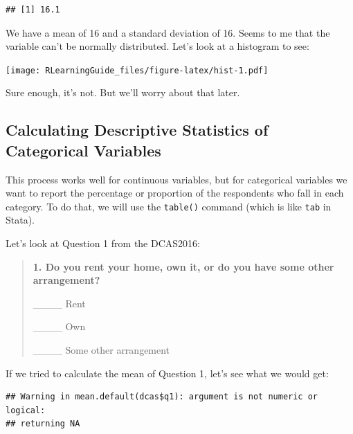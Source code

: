 \documentclass[]{article}
\newenvironment{Shaded}{\begin{snugshade}}{\end{snugshade}}
\newcommand{\KeywordTok}[1]{\textcolor[rgb]{0.13,0.29,0.53}{\textbf{{#1}}}}
\newcommand{\NormalTok}[1]{{#1}}
\begin{document}
\begin{verbatim}
## [1] 16.1
\end{verbatim}

We have a mean of 16 and a standard deviation of 16. Seems to me that
the variable can't be normally distributed. Let's look at a histogram to
see:

\begin{Shaded}
\end{Shaded}

\texttt{[image: RLearningGuide\_files/figure-latex/hist-1.pdf]}

Sure enough, it's not. But we'll worry about that later.

\subsection{Calculating Descriptive Statistics of Categorical
Variables}\label{calculating-descriptive-statistics-of-categorical-variables}

This process works well for continuous variables, but for categorical
variables we want to report the percentage or proportion of the
respondents who fall in each category. To do that, we will use the
\texttt{table()} command (which is like \texttt{tab} in Stata).

Let's look at Question 1 from the DCAS2016:

\begin{quote}
\textbf{1. Do you rent your home, own it, or do you have some other
arrangement?}

\_\_\_\_ Rent

\_\_\_\_ Own

\_\_\_\_ Some other arrangement
\end{quote}

If we tried to calculate the mean of Question 1, let's see what we would
get:

\begin{Shaded}
\end{Shaded}

\begin{verbatim}
## Warning in mean.default(dcas$q1): argument is not numeric or logical:
## returning NA
\end{verbatim}
\end{document}
